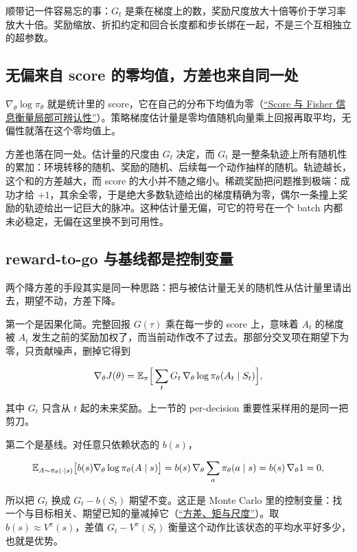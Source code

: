 顺带记一件容易忘的事：\(G_t\) 是乘在梯度上的数，奖励尺度放大十倍等价于学习率放大十倍。奖励缩放、折扣约定和回合长度都和步长绑在一起，不是三个互相独立的超参数。

\subsection{无偏来自 score 的零均值，方差也来自同一处}

\(\nabla_\theta\log\pi_\theta\) 就是统计里的 score，它在自己的分布下均值为零（\hyperref[sec:11-Mathematical-Statistics/03-Sufficient-Statistics-and-Information/02]{``Score 与 Fisher 信息衡量局部可辨认性''}）。策略梯度估计量是零均值随机向量乘上回报再取平均，无偏性就落在这个零均值上。

方差也落在同一处。估计量的尺度由 \(G_t\) 决定，而 \(G_t\) 是一整条轨迹上所有随机性的累加：环境转移的随机、奖励的随机、后续每一个动作抽样的随机。轨迹越长，这个和的方差越大，而 score 的大小并不随之缩小。稀疏奖励把问题推到极端：成功才给 \(+1\)，其余全零，于是绝大多数轨迹给出的梯度精确为零，偶尔一条撞上奖励的轨迹给出一记巨大的脉冲。这种估计量无偏，可它的符号在一个 batch 内都未必稳定，无偏在这里换不到可用性。

\subsection{reward-to-go 与基线都是控制变量}

两个降方差的手段其实是同一种思路：把与被估计量无关的随机性从估计量里请出去，期望不动，方差下降。

第一个是因果化简。完整回报 \(G(\tau)\) 乘在每一步的 score 上，意味着 \(A_t\) 的梯度被 \(A_t\) 发生之前的奖励加权了，而当前动作改不了过去。那部分交叉项在期望下为零，只贡献噪声，删掉它得到

\[
\nabla_\theta J(\theta)=\mathbb{E}_\pi\Big[\sum_t G_t\,\nabla_\theta\log\pi_\theta(A_t\mid S_t)\Big],
\]

其中 \(G_t\) 只含从 \(t\) 起的未来奖励。上一节的 per-decision 重要性采样用的是同一把剪刀。

第二个是基线。对任意只依赖状态的 \(b(s)\)，

\[
\mathbb{E}_{A\sim\pi_\theta(\cdot\mid s)}\big[b(s)\nabla_\theta\log\pi_\theta(A\mid s)\big]
=b(s)\,\nabla_\theta\sum_a\pi_\theta(a\mid s)=b(s)\,\nabla_\theta 1=0,
\]

所以把 \(G_t\) 换成 \(G_t-b(S_t)\) 期望不变。这正是 Monte Carlo 里的控制变量：找一个与目标相关、期望已知的量减掉它（\hyperref[sec:05-Probability/04-Expectation-and-Moments/02]{``方差、矩与尺度''}）。取 \(b(s)\approx V^\pi(s)\)，差值 \(G_t-V^\pi(S_t)\) 衡量这个动作比该状态的平均水平好多少，也就是优势。

